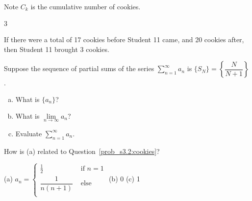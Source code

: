 \begin{hint}
Note $C_k$ is the cumulative number of cookies.
\end{hint}
\begin{answer}
3
\end{answer}
\begin{solution}
If there were a total of 17 cookies before Student 11 came, and 20 cookies after, then Student 11 brought 3 cookies.

\begin{center}
\end{center}

\end{solution}
\begin{Mquestion}\label{prob_s3.2:partsums}
Suppose the sequence of partial sums of the series $\displaystyle\sum_{n=1}^\infty a_n$
is $\{S_N\} = \left\{\dfrac{N}{N+1}\right\}$.
\begin{enumerate}[(a)]
\item What is $\{a_n\}$?
\item What is $\lim\limits_{n \to \infty} a_n $?
\item Evaluate $\displaystyle\sum_{n=1}^\infty a_n$.
\end{enumerate}
\end{Mquestion}
\begin{hint}
How is (a) related to Question~\ref{prob_s3.2:cookies}?
\end{hint}
\begin{answer}
(a) $\displaystyle a_n = \begin{cases}
\frac12 &\mbox{ if } n=1\\
\dfrac{1}{n(n+1)} &\mbox{ else }\\
\end{cases}$
\qquad\qquad (b) 0 \qquad (c) 1
\end{answer}
